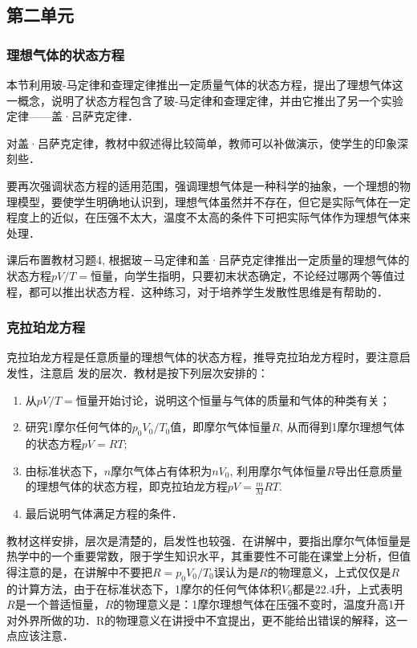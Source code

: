 \subsection{第二单元}
\subsubsection{理想气体的状态方程}

本节利用玻-马定律和查理定律推出一定质量气体的状态方程，提出了理想气体这一概念，说明了状态方程包含了玻-马定律和查理定律，并由它推出了另一个实验定律——盖·吕萨克定律．

对盖·吕萨克定律，教材中叙述得比较简单，教师可以补做演示，使学生的印象深刻些．

要再次强调状态方程的适用范围，强调理想气体是一种科学的抽象，一个理想的物理模型，要使学生明确地认识到，理想气体虽然并不存在，但它是实际气体在一定程度上的近似，在压强不太大，温度不太高的条件下可把实际气体作为理想气体来处理．

课后布置教材习题4, 根据玻－马定律和盖·吕萨克定律推出一定质量的理想气体的状态方程$pV/T=$恒量，向学生指明，只要初末状态确定，不论经过哪两个等值过程，都可以推出状态方程．这种练习，对于培养学生发散性思维是有帮助的．

\subsubsection{克拉珀龙方程}

克拉珀龙方程是任意质量的理想气体的状态方程，推导克拉珀龙方程时，要注意启发性，注意启
发的层次．教材是按下列层次安排的：
\begin{enumerate}
\item 从$pV/T=$恒量开始讨论，说明这个恒量与气体的质量和气体的种类有关；
\item 研究1摩尔任何气体的$p_0V_0/T_0$值，即摩尔气体恒量$R$, 从而得到1摩尔理想气体的状态方程$pV=RT$;
\item 由标准状态下，$n$摩尔气体占有体积为$nV_0$, 利用摩尔气体恒量$R$导出任意质量的理想气体的状态方程，即克拉珀龙方程$pV=\frac{m}{M}RT$.
\item 最后说明气体满足方程的条件．
\end{enumerate}

教材这样安排，层次是清楚的，启发性也较强．在讲解中，要指出摩尔气体恒量是热学中的一个重要常数，限于学生知识水平，其重要性不可能在课堂上分析，但值得注意的是，在讲解中不要把$R=p_0V_0/T_0$误认为是$R$的物理意义，上式仅仅是$R$的计算方法，由于在标准状态下，1摩尔的任何气体体积$V_0$都是22.4升，上式表明$R$是一个普适恒量，$R$的物理意义是：1摩尔理想气体在压强不变时，温度升高1开对外界所做的功．R的物理意义在讲授中不宜提出，更不能给出错误的解释，这一点应该注意．

